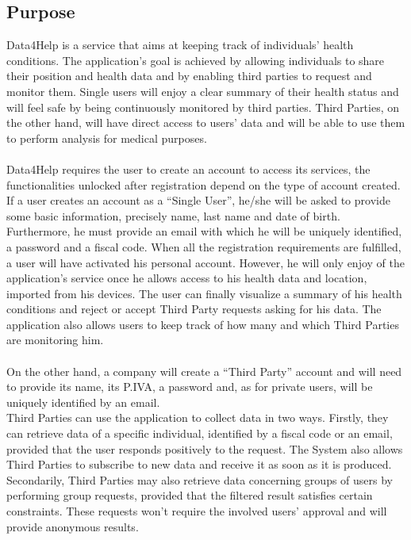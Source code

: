 \documentclass[titlepage]{article}
\begin{document}
	
	\subsection{Purpose}
Data4Help is a service that aims at keeping track of individuals’ health conditions. The application’s goal is achieved by allowing individuals to share their position and health data and by enabling third parties to request and monitor them. 
Single users will enjoy a clear summary of their health status and will feel safe by being continuously monitored by third parties. Third Parties, on the other hand, will have direct access to users’ data and will be able to use them to perform analysis for medical purposes. \\
\\
Data4Help requires the user to create an account to access its services, the functionalities unlocked after registration depend on the type of account created.\\
If a user creates an account as a “Single User”, he/she will be asked to provide some basic information, precisely name, last name and date of birth. Furthermore, he must provide an email with which he will be uniquely identified, a password and a fiscal code. When all the registration requirements are fulfilled, a user will have activated his personal account. However, he will only enjoy of the application’s service once he allows access to his health data and location, imported from his devices.
The user can finally visualize a summary of his health conditions and reject or accept Third Party requests asking for his data. The application also allows users to keep track of how many and which Third Parties are monitoring him.\\
\\
On the other hand, a company will create a “Third Party” account and will need to provide its name, its P.IVA, a password and, as for private users, will be uniquely identified by an email.  \\
Third Parties can use the application to collect data in two ways. Firstly, they can retrieve data of a specific individual, identified by a fiscal code or an email, provided that the user responds positively to the request. The System also allows Third Parties to subscribe to new data and receive it as soon as it is produced. \\
Secondarily, Third Parties may also retrieve data concerning groups of users by performing group requests, provided that the filtered result satisfies certain constraints. These requests won’t require the involved users’ approval and will provide anonymous results.\\
\end{document}
